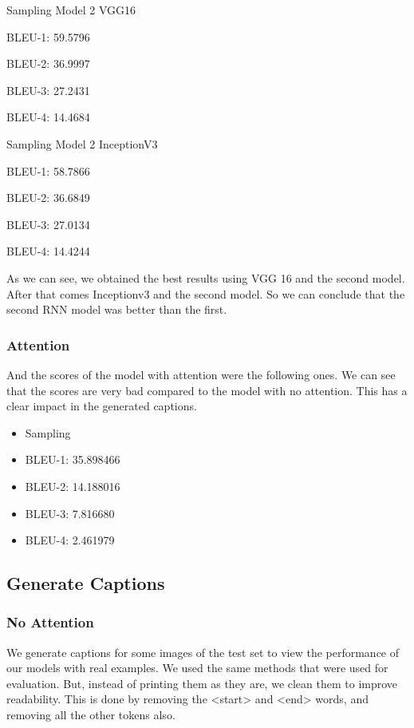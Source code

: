 \documentclass{article} %
\begin{document}
\begin{itemize}
\begin{multicols}{2}
    \item Sampling Model 2 VGG16
    \item BLEU-1: 59.5796
    \item BLEU-2: 36.9997
    \item BLEU-3: 27.2431
    \item BLEU-4: 14.4684
    \item Sampling Model 2 InceptionV3
    \item BLEU-1: 58.7866
    \item BLEU-2: 36.6849
    \item BLEU-3: 27.0134
    \item BLEU-4: 14.4244
\end{multicols}
\end{itemize}

As we can see, we obtained the best results using VGG 16 and the second model. After that comes Inceptionv3 and the second model. So we can conclude that the second RNN model was better than the first.

\subsubsection{Attention}
And the scores of the model with attention were the following ones. We can see that the scores are very bad compared to the model with no attention. This has a clear impact in the generated captions.

\begin{itemize}
    \item Sampling
    \item BLEU-1: 35.898466
    \item BLEU-2: 14.188016
    \item BLEU-3: 7.816680
    \item BLEU-4: 2.461979
\end{itemize}


\subsection{Generate Captions}

\subsubsection{No Attention}
We generate captions for some images of the test set to view the performance of our models with real examples. We used the same methods that were used for evaluation. But, instead of printing them as they are, we clean them to improve readability. This is done by removing the <start> and <end> words, and removing all the other tokens also.
\end{document}
